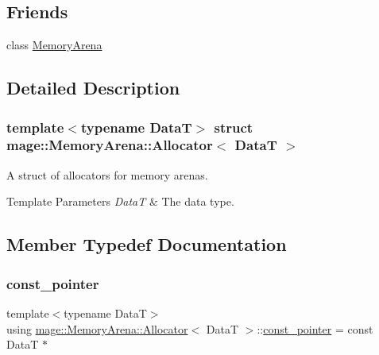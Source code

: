 \subsection*{Friends}
\begin{DoxyCompactItemize}
\item 
class \hyperlink{structmage_1_1_memory_arena_1_1_allocator_a934e79307a45b6e72da26d1f10079550}{Memory\+Arena}
\end{DoxyCompactItemize}


\subsection{Detailed Description}
\subsubsection*{template$<$typename DataT$>$\newline
struct mage\+::\+Memory\+Arena\+::\+Allocator$<$ Data\+T $>$}

A struct of allocators for memory arenas.


\begin{DoxyTemplParams}{Template Parameters}
{\em DataT} & The data type. \\
\hline
\end{DoxyTemplParams}


\subsection{Member Typedef Documentation}
\hypertarget{structmage_1_1_memory_arena_1_1_allocator_a3b15a7f2d3fd22fb2626b335f15d5e17}{}\label{structmage_1_1_memory_arena_1_1_allocator_a3b15a7f2d3fd22fb2626b335f15d5e17} 
\subsubsection{\texorpdfstring{const\+\_\+pointer}{const\_pointer}}
{\footnotesize\ttfamily template$<$typename DataT$>$ \\
using \hyperlink{structmage_1_1_memory_arena_1_1_allocator}{mage\+::\+Memory\+Arena\+::\+Allocator}$<$ DataT $>$\+::\hyperlink{structmage_1_1_memory_arena_1_1_allocator_a3b15a7f2d3fd22fb2626b335f15d5e17}{const\+\_\+pointer} =  const DataT $\ast$}

